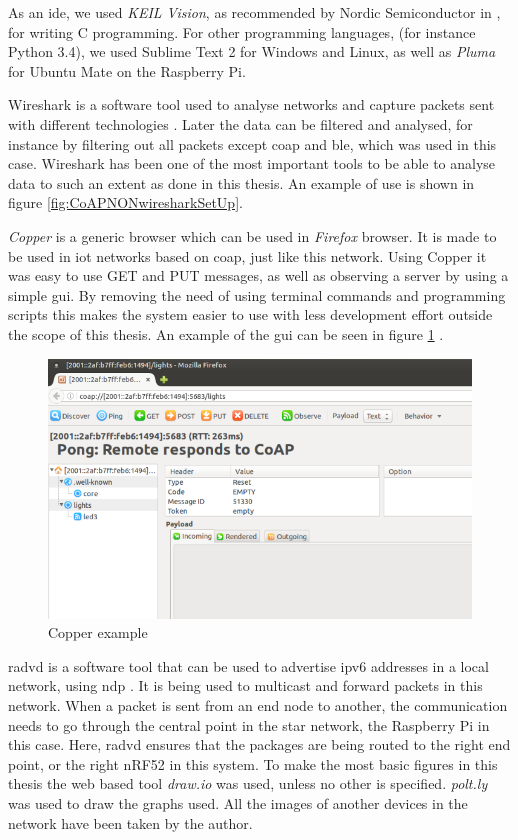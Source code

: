 \noindent As an \gls{ide}, we used \textit{KEIL Vision}, as recommended by Nordic Semiconductor in \cite{nord}, for writing C programming. For other programming languages, (for instance Python 3.4), we used Sublime Text 2 for Windows and Linux, as well as \textit{Pluma} for Ubuntu Mate on the Raspberry Pi. 

\noindent Wireshark is a software tool used to analyse networks and capture packets sent with different technologies \cite{lamping2004wireshark}. Later the data can be filtered and analysed, for instance by filtering out all packets except \gls{coap} and \gls{ble}, which was used in this case. Wireshark has been one of the most important tools to be able to analyse data to such an extent as done in this thesis. An example of use is shown in figure \ref{fig:CoAPNONwiresharkSetUp}. 

\noindent \textit{Copper}\cite{copper3} is a generic browser which can be used in \textit{Firefox} browser. It is made to be used in \gls{iot} networks based on \gls{coap}, just like this network. Using Copper it was easy to use GET and PUT messages, as well as observing a server by using a simple \gls{gui}. By removing the need of using terminal commands and programming scripts this makes the system easier to use with less development effort outside the scope of this thesis. An example of the \gls{gui} can be seen in figure \ref{fig:copperExample} 
\cite{kovatsch2011demo}.

\begin{figure}[ht]
    \centering
    \includegraphics[width=1.0\textwidth]{CopperExample.png}    
    \caption{Copper example}
    \label{fig:copperExample}
\end{figure}

\noindent \gls{radvd} is a software tool that can be used to advertise \gls{ipv6} addresses in a local network, using \gls{ndp} \cite{chown2011rogue}. It is being used to multicast and forward packets in this network. When a packet is sent from an end node to another, the communication needs to go through the central point in the star network, the Raspberry Pi in this case. Here, \gls{radvd} ensures that the packages are being routed to the right end point, or the right nRF52 in this system. To make the most basic figures in this thesis the web based tool \textit{draw.io} was used, unless no other is specified. \textit{polt.ly} was used to draw the graphs used. All the images of another devices in the network have been taken by the author. 



